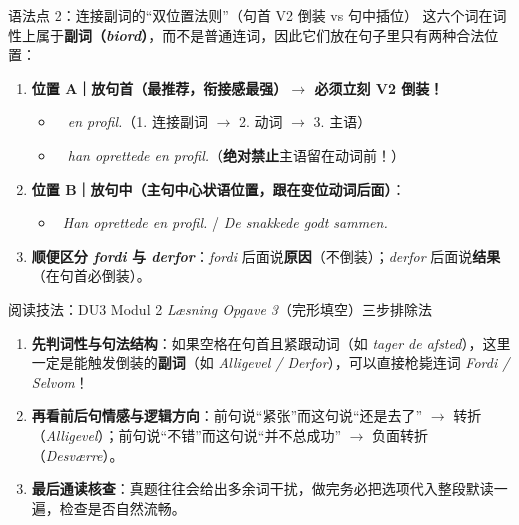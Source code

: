 \begin{grammatikbox}{语法点 2：连接副词的“双位置法则”（句首 V2 倒装 vs 句中插位）}
这六个词在词性上属于\textbf{副词（\textit{biord}）}，而不是普通连词，因此它们放在句子里只有两种合法位置：
\begin{enumerate}
  \item \textbf{位置 A｜放句首（最推荐，衔接感最强）$\rightarrow$ 必须立刻 V2 倒装！}
    \begin{itemize}
      \item \textit{\   en profil.}（1. 连接副词 $\rightarrow$ 2. 动词 $\rightarrow$ 3. 主语）
      \item \textit{\  han oprettede en profil.}（\textbf{绝对禁止}主语留在动词前！）
    \end{itemize}
  \item \textbf{位置 B｜放句中（主句中心状语位置，跟在变位动词后面）}：
    \begin{itemize}
      \item \textit{\ Han oprettede  en profil.} / \textit{De snakkede  godt sammen.}
    \end{itemize}
  \item \textbf{顺便区分 \textit{fordi} 与 \textit{derfor}}：\textit{fordi} 后面说\textbf{原因}（不倒装）；\textit{derfor} 后面说\textbf{结果}（在句首必倒装）。
\end{enumerate}
\end{grammatikbox}

\begin{grammatikbox}{阅读技法：DU3 Modul 2 \textit{Læsning Opgave 3}（完形填空）三步排除法}
\begin{enumerate}
  \item \textbf{先判词性与句法结构}：如果空格在句首且紧跟动词（如 \textit{\underline{\hspace{0.8cm}} tager de afsted}），这里一定是能触发倒装的\textbf{副词}（如 \textit{Alligevel / Derfor}），可以直接枪毙连词 \textit{Fordi / Selvom}！
  \item \textbf{再看前后句情感与逻辑方向}：前句说“紧张”而这句说“还是去了” $\rightarrow$ 转折（\textit{Alligevel}）；前句说“不错”而这句说“并不总成功” $\rightarrow$ 负面转折（\textit{Desværre}）。
  \item \textbf{最后通读核查}：真题往往会给出多余词干扰，做完务必把选项代入整段默读一遍，检查是否自然流畅。
\end{enumerate}
\end{grammatikbox}

